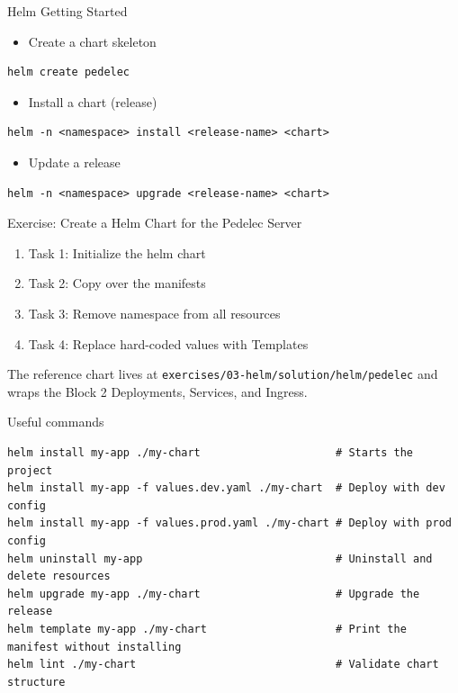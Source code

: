 \begin{frame}[fragile]{Helm Getting Started}
  \begin{itemize}\item Create a chart skeleton\end{itemize}
  \begin{termbox}
\begin{lstlisting}[style=wstermstyle]
helm create pedelec
\end{lstlisting}
  \end{termbox}
  \begin{itemize}\item Install a chart (release)\end{itemize}
  \begin{termbox}
\begin{lstlisting}[style=wstermstyle]
helm -n <namespace> install <release-name> <chart>
\end{lstlisting}
  \end{termbox}
  \begin{itemize}\item Update a release\end{itemize}
  \begin{termbox}
\begin{lstlisting}[style=wstermstyle]
helm -n <namespace> upgrade <release-name> <chart>
\end{lstlisting}
  \end{termbox}
\end{frame}

\begin{frame}{\exicon Exercise: Create a Helm Chart for the Pedelec Server}
  \begin{enumerate}
    \item Task 1: Initialize the helm chart
    \item Task 2: Copy over the manifests
    \item Task 3: Remove namespace from all resources
    \item Task 4: Replace hard-coded values with Templates
  \end{enumerate}
  \bigskip
  The reference chart lives at \texttt{exercises/03-helm/solution/helm/pedelec}
  and wraps the Block 2 Deployments, Services, and Ingress.
\end{frame}

\begin{frame}[fragile]{Useful commands}
  \begin{termbox}
\begin{lstlisting}[style=wstermstyle, basicstyle=\ttfamily\scriptsize\color{wsgreen}]
helm install my-app ./my-chart                     # Starts the project
helm install my-app -f values.dev.yaml ./my-chart  # Deploy with dev config
helm install my-app -f values.prod.yaml ./my-chart # Deploy with prod config
helm uninstall my-app                              # Uninstall and delete resources
helm upgrade my-app ./my-chart                     # Upgrade the release
helm template my-app ./my-chart                    # Print the manifest without installing
helm lint ./my-chart                               # Validate chart structure
\end{lstlisting}
  \end{termbox}
\end{frame}
